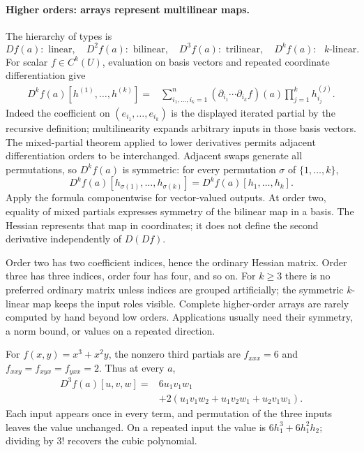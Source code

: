 \paragraph{Higher orders: arrays represent multilinear maps.}
The hierarchy of types is
\[
Df(a):\text{ linear},\quad D^2f(a):\text{ bilinear},\quad
D^3f(a):\text{ trilinear},\quad D^kf(a):\text{ $k$-linear}.
\]
For scalar $f\in C^k(U)$, evaluation on basis vectors and repeated
coordinate differentiation give
\[
\begin{split}
D^kf(a)[h^{(1)},\ldots,h^{(k)}]
={}&\sum_{i_1,\ldots,i_k=1}^n
(\partial_{i_1}\cdots\partial_{i_k}f)(a)
\prod_{j=1}^k h^{(j)}_{i_j}.
\end{split}
\]
Indeed the coefficient on $(e_{i_1},\ldots,e_{i_k})$ is the displayed
iterated partial by the recursive definition; multilinearity expands
arbitrary inputs in those basis vectors. The mixed-partial theorem applied
to lower derivatives permits adjacent differentiation orders to be
interchanged. Adjacent swaps generate all permutations, so $D^kf(a)$
is symmetric: for every permutation $\sigma$ of $\{1,\ldots,k\}$,
\[
D^kf(a)[h_{\sigma(1)},\ldots,h_{\sigma(k)}]
=D^kf(a)[h_1,\ldots,h_k].
\]
Apply the formula componentwise for vector-valued outputs. At order two,
equality of mixed partials expresses symmetry of the bilinear map in a
basis. The Hessian represents that map in coordinates; it does not define
the second derivative independently of $D(Df)$.

Order two has two coefficient indices, hence the ordinary Hessian matrix.
Order three has three indices, order four has four, and so on. For
$k\geq3$ there is no preferred ordinary matrix unless indices are grouped
artificially; the symmetric $k$-linear map keeps the input roles visible.
Complete higher-order arrays are rarely computed by hand beyond low
orders. Applications usually need their symmetry, a norm bound, or values
on a repeated direction.
\begin{example}
For $f(x,y)=x^3+x^2y$, the nonzero third partials are
$f_{xxx}=6$ and $f_{xxy}=f_{xyx}=f_{yxx}=2$. Thus at every $a$,
\[
\begin{split}
D^3f(a)[u,v,w]={}&6u_1v_1w_1\\
&+2(u_1v_1w_2+u_1v_2w_1+u_2v_1w_1).
\end{split}
\]
Each input appears once in every term, and permutation of the three
inputs leaves the value unchanged. On a repeated input the value is
$6h_1^3+6h_1^2h_2$; dividing by $3!$ recovers the cubic polynomial.
\end{example}

